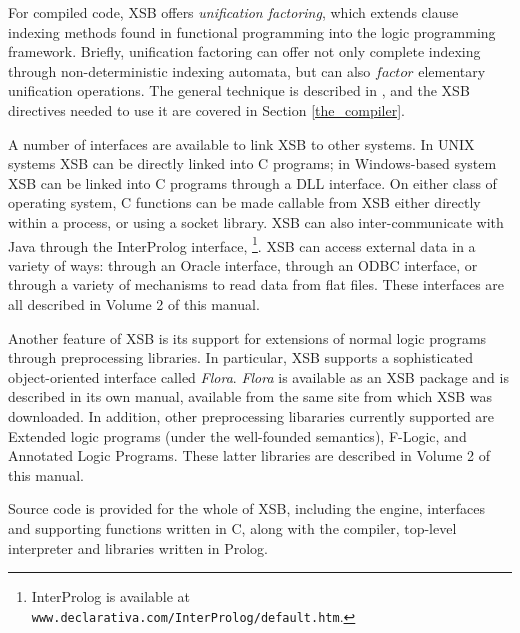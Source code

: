For compiled code, XSB offers {\em unification factoring}, which
extends clause indexing methods found in functional programming into
the logic programming framework.  Briefly, unification factoring can
offer not only complete indexing through non-deterministic indexing
automata, but can also $factor$ elementary unification operations.
The general technique is described in \cite{DRRSSSW95}, and the XSB
directives needed to use it are covered in Section
\ref{the_compiler}.

A number of interfaces are available to link XSB to other systems.  In
UNIX systems XSB can be directly linked into C programs; in
Windows-based system XSB can be linked into C programs through a DLL
interface.  On either class of operating system, C functions can be
made callable from XSB either directly within a process, or using a
socket library.  XSB can also inter-communicate with Java through the
InterProlog interface, \footnote{InterProlog is available at {\tt
www.declarativa.com/InterProlog/default.htm}.}.  XSB can access
external data in a variety of ways: through an Oracle interface,
through an ODBC interface, or through a variety of mechanisms to read
data from flat files.  These interfaces are all described in Volume 2
of this manual.


Another feature of XSB is its support for extensions of normal logic
programs through preprocessing libraries.  In particular, XSB supports
a sophisticated object-oriented interface called {\em Flora}.  {\em
Flora} is available as an XSB package and is described in its own
manual, available from the same site from which XSB was downloaded.
In addition, other preprocessing libararies currently supported are
Extended logic programs (under the well-founded semantics), F-Logic,
and Annotated Logic Programs.  These latter libraries are described in
Volume 2 of this manual.

Source code is provided for the whole of XSB, including the
engine, interfaces and supporting functions written in C, along with
the compiler, top-level interpreter and libraries written in Prolog.

